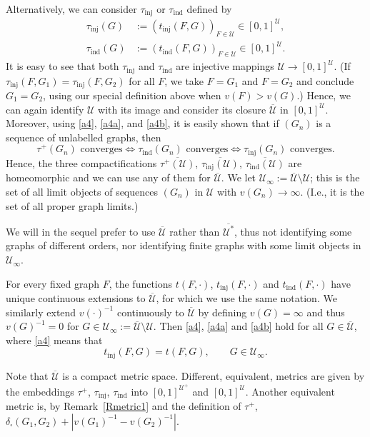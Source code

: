 \documentclass[11pt,reqno,tbtags]{amsart}
\numberwithin{equation}{section}
\theoremstyle{definition}
\theoremstyle{remark}
\newcommand{\refR}[1]{Remark~\ref{#1}}
\newcommand\gd{\delta}
\newcommand\cU{{\mathcal U}}
\newcommand\qw{^{-1}}
\renewcommand{\=}{:=}
\newcommand\oi{[0,1]}
\newcommand{\tinj}{t_{\mathrm{inj}}}
\newcommand{\tind}{t_{\mathrm{ind}}}
\newcommand{\cux}{\cU^*}
\newcommand{\cuxq}{\overline{\cux}}
\newcommand{\cuq}{\overline{\cU}}
\newcommand{\cuu}{\cU^+}
\newcommand{\cuoo}{\cU_\infty}
\newcommand{\oiu}{\oi^{\cU}}
\newcommand{\oiuu}{\oi^{\cuu}}
\newcommand{\tauu}{\tau^+}
\newcommand{\tauinj}{\tau_{\mathrm{inj}}}
\newcommand{\tauind}{\tau_{\mathrm{ind}}}
\newcommand{\dcut}{\gd_\square}
\begin{document}
Alternatively, we can consider $\tauinj$ or $\tauind$ defined by
\begin{align*}
  \tauinj(G)&\=(\tinj(F,G))_{F\in\cU}\in\oiu, 
\\
  \tauind(G)&\=(\tind(F,G))_{F\in\cU}\in\oiu.
\end{align*}
It is easy to see that both $\tauinj$ and $\tauind$ are injective
mappings $\cU\to\oiu$.
(If $\tauinj(F,G_1)=\tauinj(F,G_2)$ for all $F$, we take $F=G_1$ and
$F=G_2$
and conclude $G_1=G_2$,
using our special definition above when $v(F)>v(G)$.)
Hence, we can again identify $\cU$ with its image
and consider its closure $\cuq$ in $\oiu$. Moreover, using \eqref{a4},
\eqref{a4a}, and \eqref{a4b}, it is easily shown that if $(G_n)$ is a
sequence of unlabelled graphs, then 
\begin{equation*}
  \tauu(G_n) \text{ converges}
\iff
  \tauind(G_n) \text{ converges}
\iff
  \tauinj(G_n) \text{ converges}.
\end{equation*}
Hence, the three compactifications $\overline{\tauu(\cU)}$, 
$\overline{\tauinj(\cU)}$, $\overline{\tauind(\cU)}$ are homeomorphic
and we can use any of them for $\cuq$.
We let $\cuoo\=\cuq\setminus\cU$; 
this is the set of all limit objects of sequences
$(G_n)$ in $\cU$ with $v(G_n)\to\infty$. (I.e., it is the set of all
proper graph limits.)

We will in the sequel prefer to use $\cuq$ rather than $\cuxq$, thus
not identifying some graphs of different orders, nor identifying finite graphs
with some limit objects in $\cuoo$.

For every fixed graph $F$, the functions $t(F,\cdot)$,
$\tinj(F,\cdot)$ and $\tind(F,\cdot)$ have unique continuous
extensions to $\cuq$, for which we use the same notation. 
We similarly extend $v(\cdot)\qw$ continuously
to $\cuq$ by defining $v(G)=\infty$
and thus $v(G)\qw=0$ for $G\in\cuoo\=\cuq\setminus\cU$.
Then \eqref{a4},
\eqref{a4a} and \eqref{a4b} hold for all $G\in\cuq$, where \eqref{a4}
means that 
\begin{equation}
  \label{a4x}
\tinj(F,G)=t(F,G), \qquad G\in\cuoo.
\end{equation}


Note that $\cuq$ is a compact metric space. Different, equivalent,
metrics are given by the embeddings $\tauu$, $\tauinj$, $\tauind$ into
$\oiuu$ and $\oiu$. Another equivalent metric is, by \refR{Rmetric1}
and the definition of $\tauu$, $\dcut(G_1,G_2)+|v(G_1)\qw-v(G_2)\qw|$.
\end{document}
